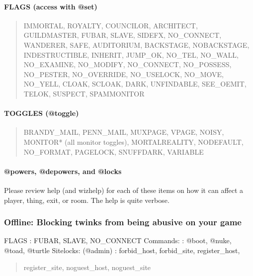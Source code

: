 \documentclass[letterpaper,10pt,english]{sphinxmanual}
\begin{document}
\paragraph{FLAGS (access with @set)}
\label{\detokenize{security:flags-access-with-set}}\begin{quote}

\sphinxAtStartPar
IMMORTAL, ROYALTY, COUNCILOR, ARCHITECT, GUILDMASTER,
FUBAR, SLAVE, SIDEFX, NO\_CONNECT, WANDERER, SAFE,
AUDITORIUM, BACKSTAGE, NOBACKSTAGE, INDESTRUCTIBLE,
INHERIT, JUMP\_OK, NO\_TEL, NO\_WALL, NO\_EXAMINE,
NO\_MODIFY, NO\_CONNECT, NO\_POSSESS, NO\_PESTER,
NO\_OVERRIDE, NO\_USELOCK, NO\_MOVE, NO\_YELL, CLOAK,
SCLOAK, DARK, UNFINDABLE, SEE\_OEMIT, TELOK, SUSPECT,
SPAMMONITOR
\end{quote}


\paragraph{TOGGLES (@toggle)}
\label{\detokenize{security:toggles-toggle}}\begin{quote}

\sphinxAtStartPar
BRANDY\_MAIL, PENN\_MAIL, MUXPAGE, VPAGE, NOISY,
MONITOR* (all monitor toggles), MORTALREALITY,
NODEFAULT, NO\_FORMAT, PAGELOCK, SNUFFDARK, VARIABLE
\end{quote}


\paragraph{@powers, @depowers, and @locks}
\label{\detokenize{security:powers-depowers-and-locks}}
\sphinxAtStartPar
Please review help (and wizhelp) for each of these items on how it can affect
a player, thing, exit, or room.  The help is quite verbose.


\subsubsection{Offline: Blocking twinks from being abusive on your game}
\label{\detokenize{security:offline-blocking-twinks-from-being-abusive-on-your-game}}
\sphinxAtStartPar
FLAGS                   : FUBAR, SLAVE, NO\_CONNECT
Commands:               : @boot, @nuke, @toad, @turtle
Sitelocks: (@admin)     : forbid\_host, forbid\_site, register\_host,
\begin{quote}

\sphinxAtStartPar
register\_site, noguest\_host, noguest\_site
\end{quote}
\end{document}
